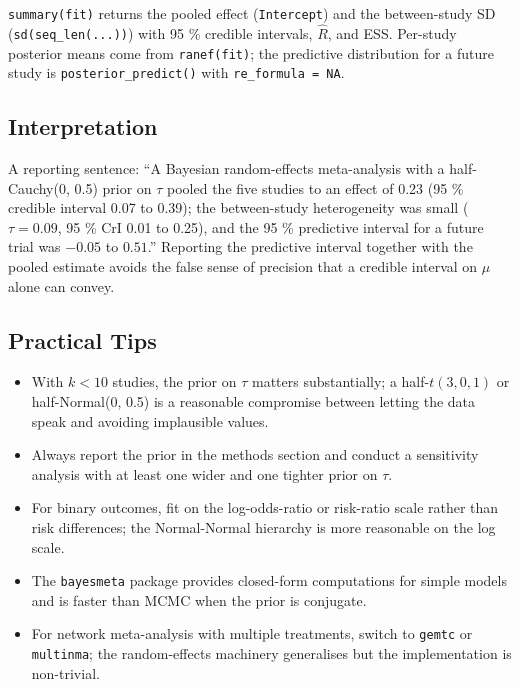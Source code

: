 \documentclass[
]{article}
\providecommand{\tightlist}{%
  \setlength{\itemsep}{0pt}\setlength{\parskip}{0pt}}
\begin{document}
\texttt{summary(fit)} returns the pooled effect (\texttt{Intercept}) and
the between-study SD (\texttt{sd(seq\_len(...))}) with 95 \% credible
intervals, \(\hat R\), and ESS. Per-study posterior means come from
\texttt{ranef(fit)}; the predictive distribution for a future study is
\texttt{posterior\_predict()} with \texttt{re\_formula\ =\ NA}.

\subsection{Interpretation}\label{interpretation}

A reporting sentence: ``A Bayesian random-effects meta-analysis with a
half-Cauchy(0, 0.5) prior on \(\tau\) pooled the five studies to an
effect of 0.23 (95 \% credible interval 0.07 to 0.39); the between-study
heterogeneity was small (\(\tau = 0.09\), 95 \% CrI 0.01 to 0.25), and
the 95 \% predictive interval for a future trial was \(-0.05\) to
\(0.51\).'' Reporting the predictive interval together with the pooled
estimate avoids the false sense of precision that a credible interval on
\(\mu\) alone can convey.

\subsection{Practical Tips}\label{practical-tips}

\begin{itemize}
\tightlist
\item
  With \(k < 10\) studies, the prior on \(\tau\) matters substantially;
  a half-\(t(3, 0, 1)\) or half-Normal(0, 0.5) is a reasonable
  compromise between letting the data speak and avoiding implausible
  values.
\item
  Always report the prior in the methods section and conduct a
  sensitivity analysis with at least one wider and one tighter prior on
  \(\tau\).
\item
  For binary outcomes, fit on the log-odds-ratio or risk-ratio scale
  rather than risk differences; the Normal-Normal hierarchy is more
  reasonable on the log scale.
\item
  The \texttt{bayesmeta} package provides closed-form computations for
  simple models and is faster than MCMC when the prior is conjugate.
\item
  For network meta-analysis with multiple treatments, switch to
  \texttt{gemtc} or \texttt{multinma}; the random-effects machinery
  generalises but the implementation is non-trivial.
\end{itemize}
\end{document}
